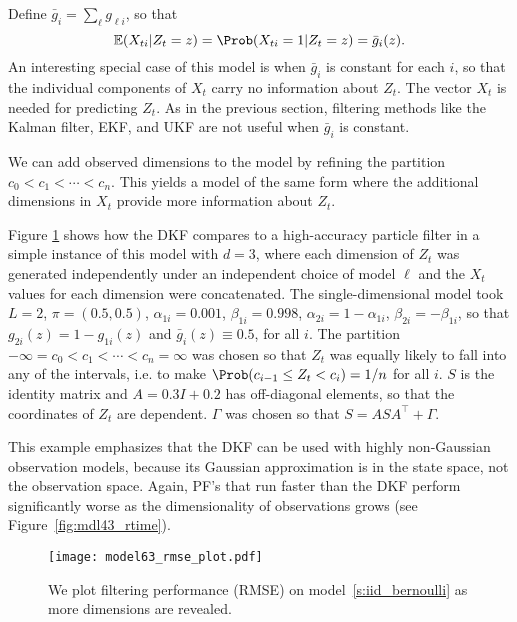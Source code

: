 
Define $\bar g_i=\sum_\ell g_{\ell i}$, so that
\[ \Exp(X_{ti}|Z_t=z) = \Prob(X_{ti}=1|Z_t=z) = \bar g_i(z) . \]
An interesting special case of this model is when $\bar g_i$ is constant for each $i$, so that the individual components of $X_t$ carry no information about $Z_t$. The vector $X_t$ is needed for predicting $Z_t$. As in the previous section, filtering methods like the Kalman filter, EKF, and UKF are not useful when $\bar g_i$ is constant. 

We can add observed dimensions to the model by refining the partition $c_0<c_1<\dotsb<c_n$.  This yields a model of the same form where the additional dimensions in $X_t$ provide more information about $Z_t$.

Figure \ref{fig:mdl43_rmse} shows how the DKF compares to a high-accuracy particle filter in a simple instance of this model with $d=3$, where each dimension of $Z_t$ was generated independently under an independent choice of model $\ell$ and the $X_t$ values for each dimension were concatenated.  The single-dimensional model took $L=2$, $\pi=(0.5,0.5)$, $\alpha_{1 i}=0.001$, $\beta_{1 i}=0.998$, $\alpha_{2 i}=1-\alpha_{1 i}$, $\beta_{2 i}=-\beta_{1 i}$, so that $g_{2 i}(z)=1-g_{1 i}(z)$ and $\bar g_i(z)\equiv 0.5$, for all $i$. The partition $-\infty=c_0<c_1<\dotsb<c_n=\infty$ was chosen so that $Z_t$ was equally likely to fall into any of the intervals, i.e. to make $\Prob(c_{i-1}\leq Z_t < c_i) = 1/n$ for all $i$.  $S$ is the identity matrix and $A=0.3I+0.2$ has off-diagonal elements, so that the coordinates of $Z_t$ are dependent.  $\Gamma$ was chosen so that $S=ASA^\intercal + \Gamma$. 

This example emphasizes that the DKF can be used with highly non-Gaussian observation models, because its Gaussian approximation is in the state space, not the observation space.  Again, PF's that run faster than the DKF perform significantly worse as the dimensionality of observations grows (see Figure~\ref{fig:mdl43_rtime}).

\begin{figure}[h!]
\centering
\texttt{[image: model63\_rmse\_plot.pdf]}
\caption[A plot of filtering performance (RMSE) on model~\ref{s:iid_bernoulli} as more dimensions are revealed.]{We plot filtering performance (RMSE) on model~\ref{s:iid_bernoulli} as more dimensions are revealed.}
\label{fig:mdl43_rmse}
\end{figure}

